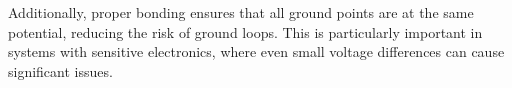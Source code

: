 Additionally, proper bonding ensures that all ground points are at the same potential, reducing the risk of ground loops. This is particularly important in systems with sensitive electronics, where even small voltage differences can cause significant issues.

